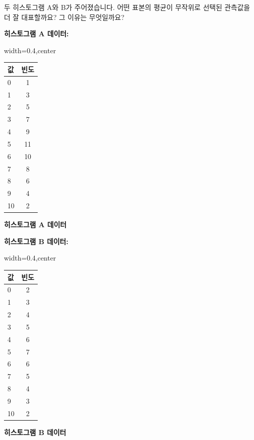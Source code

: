 \documentclass[11pt,a4paper]{book}
\providecommand{\captionof}[2]{\textbf{#2}}
\theoremstyle{definition}
\begin{document}
\begin{examplebox}[title=연습 문제: 히스토그램을 통한 평균의 대표성 판단]
두 히스토그램 A와 B가 주어졌습니다. 어떤 표본의 평균이 무작위로 선택된 관측값을 더 잘 대표할까요? 그 이유는 무엇일까요?

\textbf{히스토그램 A 데이터:}
\begin{adjustbox}{width=0.4\textwidth,center}
\begin{tabular}{lc}
\toprule
\textbf{값} & \textbf{빈도} \\
\midrule
0 & 1 \\
1 & 3 \\
2 & 5 \\
3 & 7 \\
4 & 9 \\
5 & 11 \\
6 & 10 \\
7 & 8 \\
8 & 6 \\
9 & 4 \\
10 & 2 \\
\bottomrule
\end{tabular}
\end{adjustbox}
\captionof{table}{히스토그램 A 데이터}
\label{tab:histogram_a}

\textbf{히스토그램 B 데이터:}
\begin{adjustbox}{width=0.4\textwidth,center}
\begin{tabular}{lc}
\toprule
\textbf{값} & \textbf{빈도} \\
\midrule
0 & 2 \\
1 & 3 \\
2 & 4 \\
3 & 5 \\
4 & 6 \\
5 & 7 \\
6 & 6 \\
7 & 5 \\
8 & 4 \\
9 & 3 \\
10 & 2 \\
\bottomrule
\end{tabular}
\end{adjustbox}
\captionof{table}{히스토그램 B 데이터}
\label{tab:histogram_b}


\end{examplebox}
\end{document}
